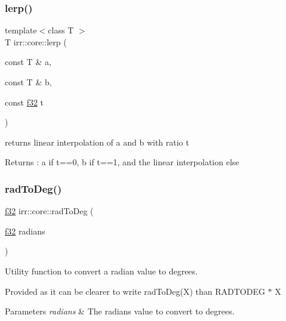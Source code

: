 \subsubsection{\texorpdfstring{lerp()}{lerp()}}
{\footnotesize\ttfamily template$<$class T $>$ \\
T irr\+::core\+::lerp (\begin{DoxyParamCaption}\item[{const T \&}]{a,  }\item[{const T \&}]{b,  }\item[{const \hyperlink{namespaceirr_a0277be98d67dc26ff93b1a6a1d086b07}{f32}}]{t }\end{DoxyParamCaption})\hspace{0.3cm}{\ttfamily [inline]}}



returns linear interpolation of a and b with ratio t 

\begin{DoxyReturn}{Returns}
\+: a if t==0, b if t==1, and the linear interpolation else 
\end{DoxyReturn}
\mbox{\label{namespaceirr_1_1core_a8deb22ad77fb8ead3f6683bbf9ad3f67}} 
\subsubsection{\texorpdfstring{rad\+To\+Deg()}{radToDeg()}\hspace{0.1cm}{\footnotesize\ttfamily [1/2]}}
{\footnotesize\ttfamily \hyperlink{namespaceirr_a0277be98d67dc26ff93b1a6a1d086b07}{f32} irr\+::core\+::rad\+To\+Deg (\begin{DoxyParamCaption}\item[{\hyperlink{namespaceirr_a0277be98d67dc26ff93b1a6a1d086b07}{f32}}]{radians }\end{DoxyParamCaption})\hspace{0.3cm}{\ttfamily [inline]}}



Utility function to convert a radian value to degrees. 

Provided as it can be clearer to write rad\+To\+Deg(\+X) than R\+A\+D\+T\+O\+D\+EG $\ast$ X 
\begin{DoxyParams}{Parameters}
{\em radians} & The radians value to convert to degrees. \\
\hline
\end{DoxyParams}
\mbox{\label{namespaceirr_1_1core_aab39939b1518daee0967c368a3bf924a}} 
